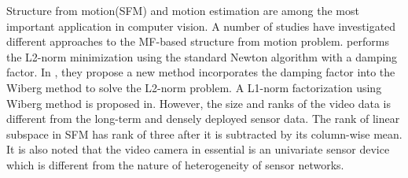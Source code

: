 Structure from motion(SFM)\cite{tomasi1992shape} and motion estimation are among the most important application in computer vision.   
A number of studies have investigated different approaches to the MF-based structure from motion problem. \cite{buchanan2005damped} performs the L2-norm minimization using the standard Newton algorithm with a damping factor. In \cite{deguchi2011efficient}, they propose a new method incorporates the damping factor into the Wiberg method to solve the L2-norm problem. A L1-norm factorization using Wiberg method is proposed in\cite{eriksson2010efficient}. 
However, the size and ranks of the video data is different from the long-term and densely deployed sensor data. 
The rank of linear subspace in SFM has rank of three after it is subtracted by its column-wise mean. It is also noted that the video camera in essential is an univariate sensor device which is different from the nature of heterogeneity of sensor networks. 
